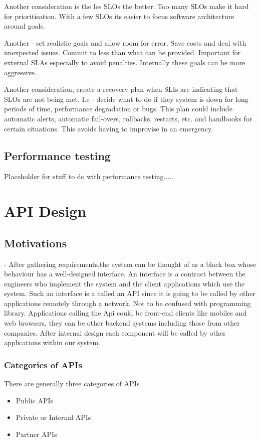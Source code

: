 \documentclass[a4paper, 11pt]{book}
\begin{document}
    Another consideration is the les SLOs the better.
    Too many SLOs make it hard for prioritisation.
    With a few SLOs its easier to focus software architecture around goals.

    Another - set realistic goals and allow room for error.
    Save costs and deal with unexpected issues.
    Commit to less than what can be provided.
    Important for external SLAs especially to avoid penalties.
    Internally these goals can be more aggressive.

    Another consideration, create a recovery plan when SLIs are indicating that SLOs are not being met.
    I.e - decide what to do if they system is down for long periods of time, performance degradation or bugs.
    This plan could include automatic alerts, automatic fail-overs, rollbacks, restarts, etc.
    and handbooks for certain situations.
    This avoids having to improvise in an emergency.


    \section{Performance testing}
    Placeholder for stuff to do with performance testing.....


    \chapter{API Design}


    \section{Motivations} - After gathering requirements,the system can be thought of as a black box whose behaviour has a well-designed interface.
    An interface is a contract between the engineers who implement the system and the client applications which use the system.
    Such an interface is a called an API since it is going to be called by other applications remotely through a network.
    Not to be confused with programming library.
    Applications calling the Api could be front-end clients like mobiles and web browsers, they can be other backend systems including those from other companies.
    After internal design each component will be called by other applications within our system.

    \subsection{Categories of APIs}
    There are generally three categories of APIs
    \begin{itemize}
        \item Public APIs
        \item Private or Internal APIs
        \item Partner APIs
    \end{itemize}
\end{document}
